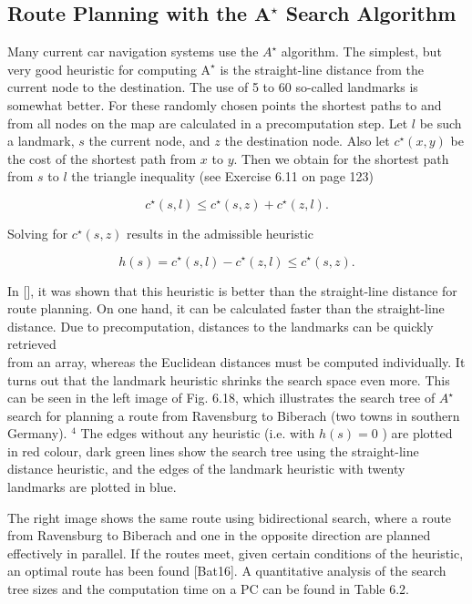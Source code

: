\documentclass[10pt]{book}
\begin{document}
\subsection{Route Planning with the $\mathbf{A}^{\star}$ Search Algorithm}
Many current car navigation systems use the $A^{\star}$ algorithm. The simplest, but very good heuristic for computing $\mathrm{A}^{\star}$ is the straight-line distance from the current node to the destination. The use of 5 to 60 so-called landmarks is somewhat better. For these randomly chosen points the shortest paths to and from all nodes on the map are calculated in a precomputation step. Let $l$ be such a landmark, $s$ the current node, and $z$ the destination node. Also let $c^{\star}(x, y)$ be the cost of the shortest path from $x$ to $y$. Then we obtain for the shortest path from $s$ to $l$ the triangle inequality (see Exercise 6.11 on page 123)

$$
c^{\star}(s, l) \leq c^{\star}(s, z)+c^{\star}(z, l) .
$$

Solving for $c^{\star}(s, z)$ results in the admissible heuristic

$$
h(s)=c^{\star}(s, l)-c^{\star}(z, l) \leq c^{\star}(s, z) .
$$

In [\cite{batzill2016optimal}], it was shown that this heuristic is better than the straight-line distance for route planning. On one hand, it can be calculated faster than the straight-line distance. Due to precomputation, distances to the landmarks can be quickly retrieved\\
from an array, whereas the Euclidean distances must be computed individually. It turns out that the landmark heuristic shrinks the search space even more. This can be seen in the left image of Fig. 6.18, which illustrates the search tree of $A^{\star}$ search for planning a route from Ravensburg to Biberach (two towns in southern Germany). ${ }^{4}$ The edges without any heuristic (i.e. with $h(s)=0$ ) are plotted in red colour, dark green lines show the search tree using the straight-line distance heuristic, and the edges of the landmark heuristic with twenty landmarks are plotted in blue.

The right image shows the same route using bidirectional search, where a route from Ravensburg to Biberach and one in the opposite direction are planned effectively in parallel. If the routes meet, given certain conditions of the heuristic, an optimal route has been found [Bat16]. A quantitative analysis of the search tree sizes and the computation time on a PC can be found in Table 6.2.\\
\end{document}
